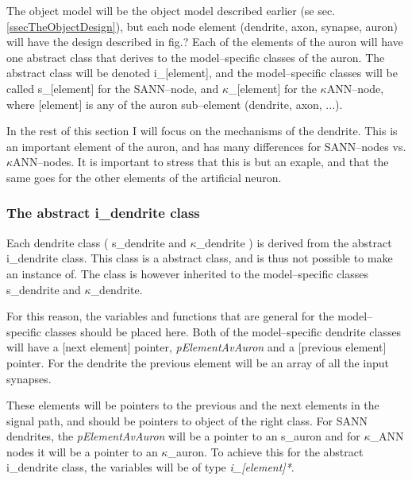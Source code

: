 	The object model will be the object model described earlier (se sec. \ref{ssecTheObjectDesign}), but each node element (dendrite, axon, synapse, auron) will have the design %
		described in fig.? %
	Each of the elements of the auron will have one abstract class that derives to the model--specific classes of the auron. 
	The abstract class will be denoted i\_[element], and the model--specific classes will be called s\_[element] for the SANN--node, and $\kappa$\_[element] for the $\kappa$ANN--node, 
		where [element] is any of the auron sub--element (dendrite, axon, ...).

	In the rest of this section I will focus on the mechanisms of the dendrite. This is an important element of the auron, and has many differences for SANN--nodes vs. $\kappa$ANN--nodes. 
	It is important to stress that this is but an exaple, and that the %
		same goes for the other elements of the artificial neuron.

	\subsubsection{The abstract i\_dendrite class}
	Each dendrite class ( s\_dendrite and $\kappa$\_dendrite ) is derived from the abstract i\_dendrite class.
	This class is a abstract class, and is thus not possible to make an instance of. The class is however inherited to the model--specific classes s\_dendrite and $\kappa$\_dendrite.

	For this reason, the variables and functions that are general for the model--specific classes should be placed here. 
	Both of the model--specific dendrite classes will have a [next element] pointer, \emph{pElementAvAuron} and a [previous element] pointer. For the dendrite the previous element will be an array of all the input synapses.

	These elements will be pointers to the previous and the next elements in the signal path, and should be pointers to object of the right class. 
	For SANN dendrites, the \emph{pElementAvAuron} will be a pointer to an s\_auron and for $\kappa$\_ANN nodes it will be a pointer to an $\kappa$\_auron. 
	To achieve this for the abstract i\_dendrite class, the variables will be of type \emph{i\_[element]*}.%

